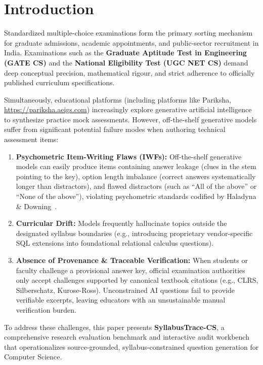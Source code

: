 \documentclass[10pt,twocolumn,letterpaper]{article}
\begin{document}
\section{Introduction}
Standardized multiple-choice examinations form the primary sorting mechanism for graduate admissions, academic appointments, and public-sector recruitment in India. Examinations such as the \textbf{Graduate Aptitude Test in Engineering (GATE CS)} and the \textbf{National Eligibility Test (UGC NET CS)} demand deep conceptual precision, mathematical rigour, and strict adherence to officially published curriculum specifications.

Simultaneously, educational platforms (including platforms like Pariksha, \url{https://pariksha.aeigs.com}) increasingly explore generative artificial intelligence to synthesize practice mock assessments. However, off-the-shelf generative models suffer from significant potential failure modes when authoring technical assessment items:
\begin{enumerate}
    \item \textbf{Psychometric Item-Writing Flaws (IWFs):} Off-the-shelf generative models can easily produce items containing answer leakage (clues in the stem pointing to the key), option length imbalance (correct answers systematically longer than distractors), and flawed distractors (such as ``All of the above'' or ``None of the above''), violating psychometric standards codified by Haladyna \& Downing~\cite{haladyna1989taxonomy, haladyna2002review}.
    \item \textbf{Curricular Drift:} Models frequently hallucinate topics outside the designated syllabus boundaries (e.g., introducing proprietary vendor-specific SQL extensions into foundational relational calculus questions).
    \item \textbf{Absence of Provenance \& Traceable Verification:} When students or faculty challenge a provisional answer key, official examination authorities only accept challenges supported by canonical textbook citations (e.g., CLRS, Silberschatz, Kurose-Ross). Unconstrained AI questions fail to provide verifiable excerpts, leaving educators with an unsustainable manual verification burden.
\end{enumerate}

To address these challenges, this paper presents \textbf{SyllabusTrace-CS}, a comprehensive research evaluation benchmark and interactive audit workbench that operationalizes source-grounded, syllabus-constrained question generation for Computer Science.
\end{document}
